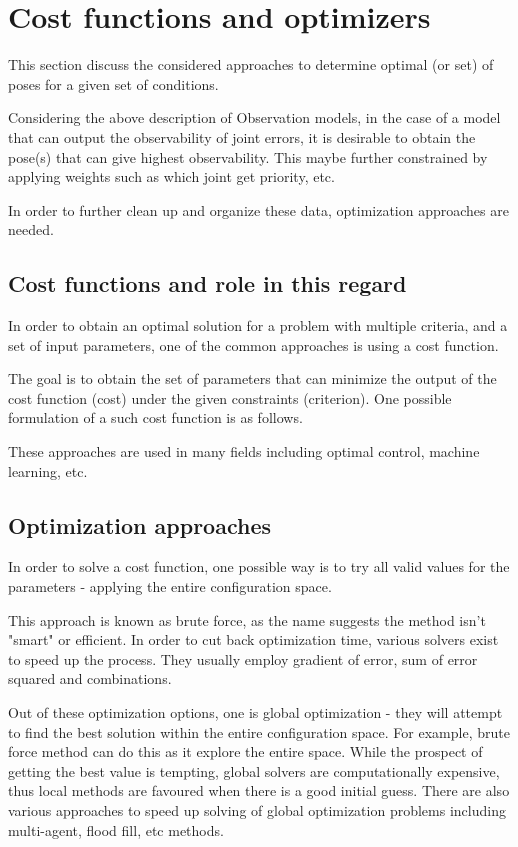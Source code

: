 \documentclass[english, printversion, nomenclature, notitle]{tuvisionthesis} %
\makeatletter
\renewcommand{\todo}[2][]{\tikzexternaldisable\@todo[#1]{#2}\tikzexternalenable}
\makeatother
\begin{document}
\section{Cost functions and optimizers}

This section discuss the considered approaches to determine optimal (or set) of poses for a given set of conditions.

Considering the above description of Observation models, in the case of a model that can output the observability of joint errors, it is desirable to obtain the pose(s) that can give highest observability. This maybe further constrained by applying weights such as which joint get priority, etc.

In order to further clean up and organize these data, optimization approaches are needed.

\subsection{Cost functions and role in this regard}

In order to obtain an optimal solution for a problem with multiple criteria, and a set of input parameters, one of the common approaches is using a cost function.

The goal is to obtain the set of parameters that can minimize the output of the cost function (cost) under the given constraints (criterion). One possible formulation of a such cost function is as follows.

\todo{example cost function}
\todo{citations}

These approaches are used in many fields including optimal control, machine learning, etc.

\subsection{Optimization approaches}

In order to solve a cost function, one possible way is to try all valid values for the parameters - applying the entire configuration space.

This approach is known as brute force, as the name suggests the method isn't "smart" or efficient. In order to cut back optimization time, various solvers exist to speed up the process. They usually employ gradient of error, sum of error squared and combinations.

Out of these optimization options, one is global optimization - they will attempt to find the best solution within the entire configuration space. For example, brute force method can do this as it explore the entire space. While the prospect of getting the best value is tempting, global solvers are computationally expensive, thus local methods are favoured when there is a good initial guess. There are also various approaches to speed up solving of global optimization problems including multi-agent, flood fill, etc methods. 
\todo{cite cite cite!!!}
\end{document}

